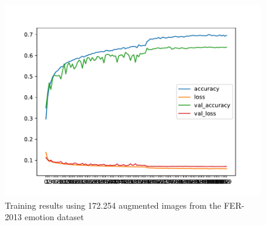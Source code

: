 \documentclass[runningheads,a4paper,11pt]{report}
\begin{document}
\begin{figure}[htbp]
\begin{center}
	\includegraphics[scale=0.8]{Fig/fer_training_28k_01_mean_square_augmented_x6.pdf}
	\caption{Training results using 172.254 augmented images from the FER-2013 emotion dataset}
	\label{fer_training_28k_01_mean_square_augmented_x6}
\end{center}
\end{figure}
\end{document}
